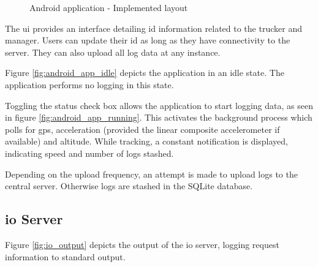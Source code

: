 \begin{figure}[H]
{        \label{fig:android_app_background}
    }
\caption{Android application - Implemented layout}
\label{fig:android_app_implementation}
\end{figure}

The \ac{ui} provides an interface detailing \ac{id} information related to the trucker and manager.
Users can update their \ac{id} as long as they have connectivity to the server.
They can also upload all log data at any instance.

Figure \ref{fig:android_app_idle} depicts the application in an idle state.
The application performs no logging in this state.

Toggling the status check box allows the application to start logging data, as seen in figure \ref{fig:android_app_running}.
This activates the background process which polls for \ac{gps}, acceleration (provided the linear composite accelerometer if available) and altitude.
While tracking, a constant notification is displayed, indicating speed and number of logs stashed.

Depending on the upload frequency, an attempt is made to upload logs to the central server.
Otherwise logs are stashed in the SQLite database.

\subsection{\Ac{io} Server}
Figure \ref{fig:io_output} depicts the output of the \ac{io} server, logging request information to standard output.

